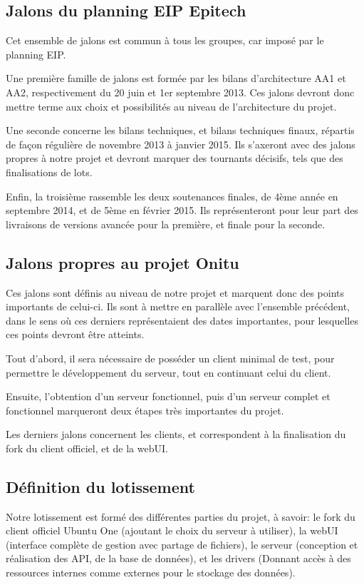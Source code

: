 \subsection{Jalons du planning EIP Epitech}
Cet ensemble de jalons est commun à tous les groupes, car imposé par le planning EIP.


Une première famille de jalons est formée par les bilans d'architecture AA1 et AA2, respectivement du 20 juin et 1er septembre 2013. Ces jalons devront donc mettre terme aux choix et possibilités au niveau de l'architecture du projet.

Une seconde concerne les bilans techniques, et bilans techniques finaux, répartis de façon régulière de novembre 2013 à janvier 2015. Ils s'axeront avec des jalons propres à notre projet et devront marquer des tournants décisifs, tels que des finalisations de lots.


Enfin, la troisième rassemble les deux soutenances finales, de 4ème année en septembre 2014, et de 5ème en février 2015. Ils représenteront pour leur part des livraisons de versions avancée pour la première, et finale pour la seconde.


\subsection{Jalons propres au projet Onitu}
Ces jalons sont définis au niveau de notre projet et marquent donc des points importants de celui-ci. Ils sont à mettre en parallèle avec l'ensemble précédent, dans le sens où ces derniers représentaient des dates importantes, pour lesquelles ces points devront être atteints.


Tout d'abord, il sera nécessaire de posséder un client minimal de test, pour permettre le développement du serveur, tout en continuant celui du client.


Ensuite, l'obtention d'un serveur fonctionnel, puis d'un serveur complet et fonctionnel marqueront deux étapes très importantes du projet.


Les derniers jalons concernent les clients, et correspondent à la finalisation du fork du client officiel, et de la webUI.


\subsection{Définition du lotissement}
Notre lotissement est formé des différentes parties du projet, à savoir: le fork du client officiel Ubuntu One (ajoutant le choix du serveur à utiliser), la webUI (interface complète de gestion avec partage de fichiers), le serveur (conception et réalisation des API, de la base de données), et les drivers (Donnant accès à des ressources internes comme externes pour le stockage des données).